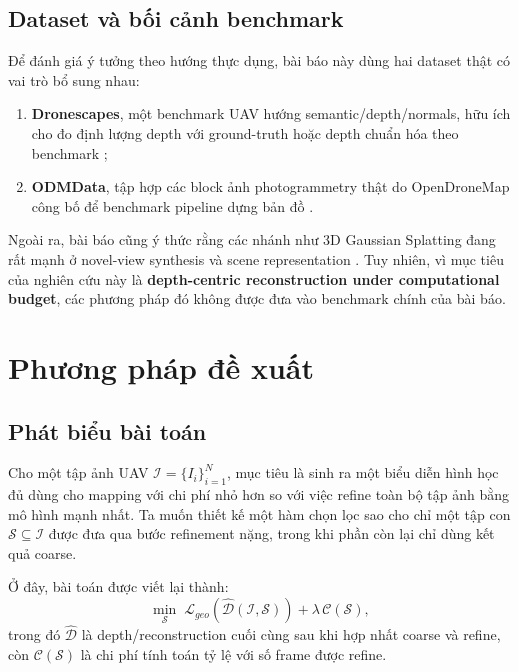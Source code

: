 \documentclass[11pt,a4paper]{article}
\begin{document}
\subsection{Dataset và bối cảnh benchmark}

Để đánh giá ý tưởng theo hướng thực dụng, bài báo này dùng hai dataset thật có vai trò bổ sung nhau:
\begin{enumerate}[leftmargin=1.5em]
  \item \textbf{Dronescapes}, một benchmark UAV hướng semantic/depth/normals, hữu ích cho đo định lượng depth với ground-truth hoặc depth chuẩn hóa theo benchmark \citep{DronescapesDataset};
  \item \textbf{ODMData}, tập hợp các block ảnh photogrammetry thật do OpenDroneMap công bố để benchmark pipeline dựng bản đồ \citep{ODMDataBenchmarks}.
\end{enumerate}

Ngoài ra, bài báo cũng ý thức rằng các nhánh như 3D Gaussian Splatting đang rất mạnh ở novel-view synthesis và scene representation \citep{Yao2026ARSGaussian,Gao2025Enhanced}. Tuy nhiên, vì mục tiêu của nghiên cứu này là \textbf{depth-centric reconstruction under computational budget}, các phương pháp đó không được đưa vào benchmark chính của bài báo.

\section{Phương pháp đề xuất}

\subsection{Phát biểu bài toán}

Cho một tập ảnh UAV $\mathcal{I}=\{I_i\}_{i=1}^{N}$, mục tiêu là sinh ra một biểu diễn hình học đủ dùng cho mapping với chi phí nhỏ hơn so với việc refine toàn bộ tập ảnh bằng mô hình mạnh nhất. Ta muốn thiết kế một hàm chọn lọc sao cho chỉ một tập con $\mathcal{S}\subseteq \mathcal{I}$ được đưa qua bước refinement nặng, trong khi phần còn lại chỉ dùng kết quả coarse.

Ở đây, bài toán được viết lại thành:
\[
\min_{\mathcal{S}} \; \mathcal{L}_{geo}(\hat{\mathcal{D}}(\mathcal{I}, \mathcal{S})) + \lambda \, \mathcal{C}(\mathcal{S}),
\]
trong đó $\hat{\mathcal{D}}$ là depth/reconstruction cuối cùng sau khi hợp nhất coarse và refine, còn $\mathcal{C}(\mathcal{S})$ là chi phí tính toán tỷ lệ với số frame được refine.
\end{document}
